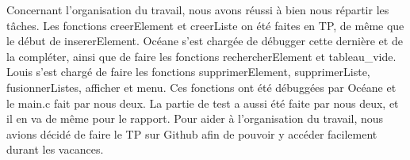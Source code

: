 \documentclass[11pt]{report}
\begin{document}
Concernant l'organisation du travail, nous avons réussi à bien nous répartir les tâches. Les fonctions creerElement et creerListe on été faites en TP, de même que le début de insererElement. Océane s'est chargée de débugger cette dernière et de la compléter, ainsi que de faire les fonctions rechercherElement et tableau\_vide. Louis s'est chargé de faire les fonctions supprimerElement, supprimerListe, fusionnerListes, afficher et menu. Ces fonctions ont été débuggées par Océane et le main.c fait par nous deux. La partie de test a aussi été faite par nous deux, et il en va de même pour le rapport. 
Pour aider à l'organisation du travail, nous avions décidé de faire le TP sur Github afin de pouvoir y accéder facilement durant les vacances. 
\end{document}

